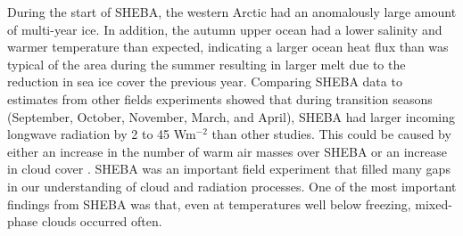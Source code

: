 During the start of SHEBA, the western Arctic had an anomalously large amount of multi-year ice. In addition, the autumn upper ocean had a lower salinity and warmer temperature than expected, indicating a larger ocean heat flux than was typical of the area during the summer resulting in larger melt due to the reduction in sea ice cover the previous year. Comparing SHEBA data to estimates from other fields experiments showed that during transition seasons (September, October, November, March, and April), SHEBA had larger incoming longwave radiation by 2 to 45 Wm$^{-2}$ than other studies. This could be caused by either an increase in the number of warm air masses over SHEBA or an increase in cloud cover \cite{Persson:2002ka}. SHEBA was an important field experiment that filled many gaps in our understanding of cloud and radiation processes. One of the most important findings from SHEBA was that, even at temperatures well below freezing, mixed-phase clouds occurred often. 